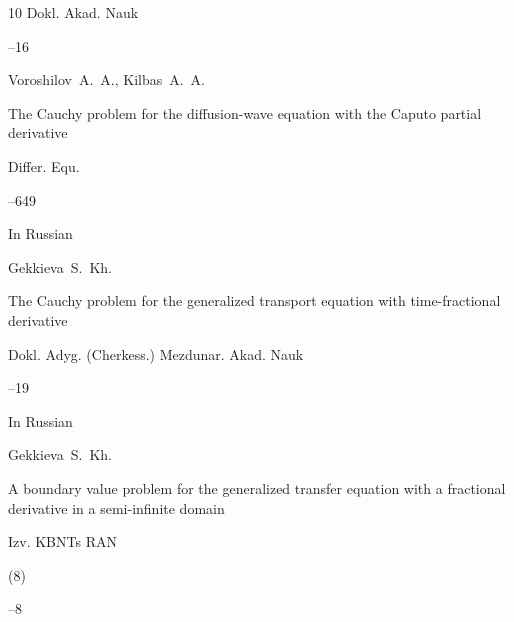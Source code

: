 \begin{thebibliography}{10}
\jour Dokl. Akad. Nauk




--16




\by Voroshilov~A.~A., Kilbas~A.~A.

\paper The Cauchy problem for the diffusion-wave equation with the Caputo partial derivative


\jour Differ. Equ.




--649





\lang In Russian

\by Gekkieva~S.~Kh.

\paper The Cauchy problem for the generalized transport equation with time-fractional derivative

\jour Dokl. Adyg. (Cherkess.) Mezdunar. Akad. Nauk




--19








\lang In Russian

\by Gekkieva~S.~Kh.

\paper A boundary value problem for the generalized transfer equation with a fractional derivative in a semi-infinite domain

\jour Izv. KBNTs RAN


(8)

--8











  






\end{thebibliography}
